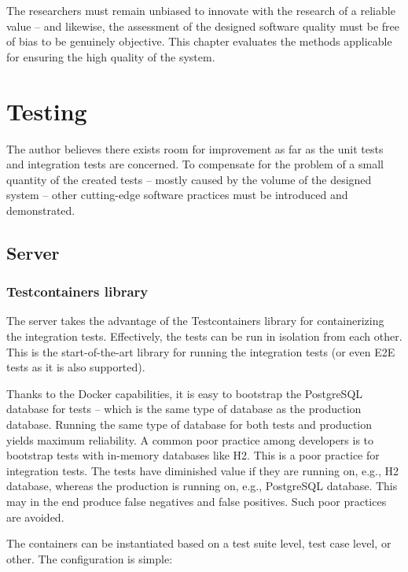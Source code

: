 \documentclass[a4paper,twoside,12pt]{book}
\begin{document}
The researchers must remain unbiased to innovate with the research of a reliable value \cite{bib:objective_research} -- and likewise, the assessment of the designed software quality must be free of bias to be genuinely objective. This chapter evaluates the methods applicable for ensuring the high quality of the system.



\section{Testing}

The author believes there exists room for improvement as far as the unit tests and integration tests are concerned. To compensate for the problem of a small quantity of the created tests -- mostly caused by the volume of the designed system -- other cutting-edge software practices must be introduced and demonstrated.

\subsection{Server}

\subsubsection{Testcontainers library}
The server takes the advantage of the Testcontainers library for containerizing the integration tests. Effectively, the tests can be run in isolation from each other. This is the start-of-the-art library for running the integration tests (or even E2E tests as it is also supported).

Thanks to the Docker capabilities, it is easy to bootstrap the PostgreSQL database for tests -- which is the same type of database as the production database. Running the same type of database for both tests and production yields maximum reliability. A common poor practice among developers is to bootstrap tests with in-memory databases like H2. This is a poor practice for integration tests. The tests have diminished value if they are running on, e.g., H2 database, whereas the production is running on, e.g., PostgreSQL database. This may in the end produce false negatives and false positives. Such poor practices are avoided.

The containers can be instantiated based on a test suite level, test case level, or other. The configuration is simple:
\end{document}

